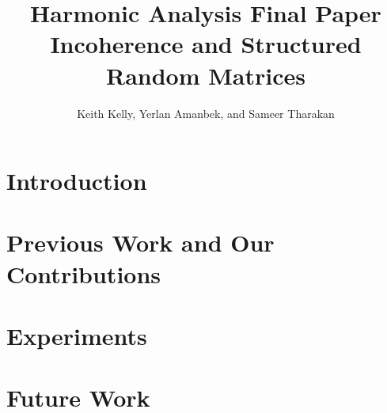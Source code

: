 \documentclass[letterpaper,10pt]{article}
\title{Harmonic Analysis Final Paper \\ Incoherence and Structured Random Matrices}
\author{Keith Kelly, Yerlan Amanbek, and Sameer Tharakan}
\begin{document}
\maketitle
\section{Introduction}


\section{Previous Work and Our Contributions}


\section{Experiments}


\section{Future Work}



\nocite{*}

\end{document}

